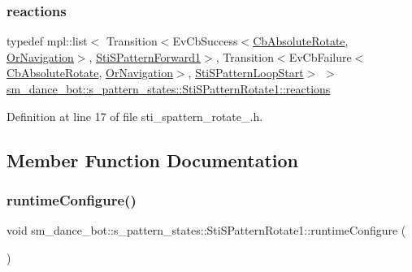 \subsubsection{\texorpdfstring{reactions}{reactions}}
{\footnotesize\ttfamily typedef mpl\+::list$<$ Transition$<$Ev\+Cb\+Success$<$\hyperlink{classcl__move__base__z_1_1CbAbsoluteRotate}{Cb\+Absolute\+Rotate}, \hyperlink{classsm__dance__bot_1_1OrNavigation}{Or\+Navigation}$>$, \hyperlink{structsm__dance__bot_1_1s__pattern__states_1_1StiSPatternForward1}{Sti\+S\+Pattern\+Forward1}$>$, Transition$<$Ev\+Cb\+Failure$<$\hyperlink{classcl__move__base__z_1_1CbAbsoluteRotate}{Cb\+Absolute\+Rotate}, \hyperlink{classsm__dance__bot_1_1OrNavigation}{Or\+Navigation}$>$, \hyperlink{structsm__dance__bot_1_1s__pattern__states_1_1StiSPatternLoopStart}{Sti\+S\+Pattern\+Loop\+Start}$>$ $>$ \hyperlink{structsm__dance__bot_1_1s__pattern__states_1_1StiSPatternRotate1_a468a9b3e22c8a98b3bdf0f03dd1687e7}{sm\+\_\+dance\+\_\+bot\+::s\+\_\+pattern\+\_\+states\+::\+Sti\+S\+Pattern\+Rotate1\+::reactions}}



Definition at line 17 of file sti\+\_\+spattern\+\_\+rotate\+\_.\+h.



\subsection{Member Function Documentation}
\mbox{\label{structsm__dance__bot_1_1s__pattern__states_1_1StiSPatternRotate1_a6ecc77b564e81e06b2c058f4edcaac10}} 
\subsubsection{\texorpdfstring{runtime\+Configure()}{runtimeConfigure()}}
{\footnotesize\ttfamily void sm\+\_\+dance\+\_\+bot\+::s\+\_\+pattern\+\_\+states\+::\+Sti\+S\+Pattern\+Rotate1\+::runtime\+Configure (\begin{DoxyParamCaption}{ }\end{DoxyParamCaption})\hspace{0.3cm}{\ttfamily [inline]}}



